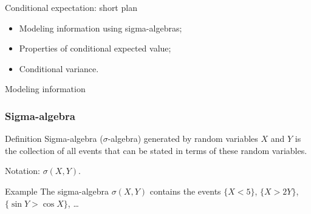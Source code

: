 
\begin{frame} %

    
\end{frame}
    
    
\begin{frame}{Conditional expectation: short plan}
    
      \begin{itemize}[<+->]
        \item Modeling information using \alert{sigma-algebras};
        \item \alert{Properties} of conditional expected value;
        \item Conditional \alert{variance}.
      \end{itemize}
    
\end{frame}
    
    
\begin{frame}{Modeling information}
    



    
\end{frame}



\begin{frame}
    \frametitle{Sigma-algebra}

    \pause
    \begin{block}{Definition \informalduck}
        \alert{Sigma-algebra} ($\sigma$-algebra) generated by random variables $X$ and $Y$ is the collection 
        of all events that can be stated in terms of these random variables. 
        
        \pause
        Notation: $\sigma(X, Y)$.
    \end{block}

    \pause
    \begin{block}{Example}
    The sigma-algebra $\sigma(X, Y)$ contains the events $\{X < 5\}$, $\{X > 2Y\}$, $\{\sin Y > \cos X\}$, \ldots
    \end{block}    

\end{frame}


